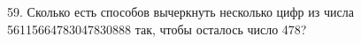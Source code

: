 59. Сколько есть способов вычеркнуть несколько цифр из числа 56115664783047830888 так, чтобы осталось число 478?\\
